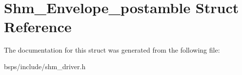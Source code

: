 \hypertarget{structShm__Envelope__postamble}{}\section{Shm\+\_\+\+Envelope\+\_\+postamble Struct Reference}
\label{structShm__Envelope__postamble}


The documentation for this struct was generated from the following file\+:\begin{DoxyCompactItemize}
\item 
bsps/include/shm\+\_\+driver.\+h\end{DoxyCompactItemize}
